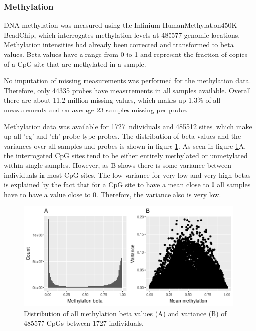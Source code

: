 \documentclass[a4paper,12pt]{article}
\begin{document}
\subsubsection{Methylation}
DNA methylation was measured using the Infinium HumanMethylation450K BeadChip, which interrogates methylation levels at 485577 genomic locations. Methylation intensities had already been corrected and transformed to beta values. Beta values have a range from 0 to 1 and represent the fraction of copies of a CpG site that are methylated in a sample.

No imputation of missing measurements was performed for the methylation data. Therefore, only 44335 probes have measurements in all samples available. Overall there are about 11.2 million missing values, which makes up 1.3\% of all measurements and on average 23 samples missing per probe. 

Methylation data was available for 1727 individuals and 485512 sites, which make up all 'cg' and 'ch' probe type probes. The distribution of beta values and the variances over all samples and probes is shown in figure \ref{fig:meth.raw.hist.var}. As seen in figure \ref{fig:meth.raw.hist.var}A, the interrogated CpG sites tend to be either entirely methylated or unmetylated within single samples. However, as B shows there is some variance between individuals in most CpG-sites. The low variance for very low and very high betas is explained by the fact that for a CpG site to have a mean close to 0 all samples have to have a value close to 0. Therefore, the variance also is very low.

 
\begin{figure}[tb]
	\includegraphics[scale = 1, keepaspectratio = true]{../figures/meth_raw_hist_var}  
	\caption{Distribution of all methylation beta values (A) and variance (B) of 485577 CpGs between 1727 individuals.}
    \label{fig:meth.raw.hist.var}
\end{figure}
\end{document}
